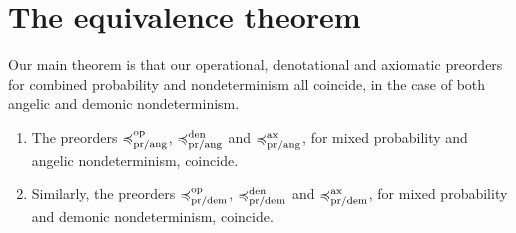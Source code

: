 \section{The equivalence theorem}
\label{section:equivalence}

Our main theorem is that our operational, denotational and axiomatic preorders for combined probability and nondeterminism all coincide, in the case of both angelic and demonic nondeterminism.
\begin{theorem} \leavevmode
\begin{enumerate} 
\item The preorders $\preccurlyeq^{\text{op}}_{\text{pr/ang}}$, $\preccurlyeq^{\text{den}}_{\text{pr/ang}}$ and $\preccurlyeq^{\text{ax}}_{\text{pr/ang}}$, for mixed probability and angelic nondeterminism, coincide.

\item Similarly, the preorders $\preccurlyeq^{\text{op}}_{\text{pr/dem}}$, $\preccurlyeq^{\text{den}}_{\text{pr/dem}}$ and $\preccurlyeq^{\text{ax}}_{\text{pr/dem}}$,
for mixed probability and demonic nondeterminism, coincide.
\end{enumerate}
\end{theorem}

